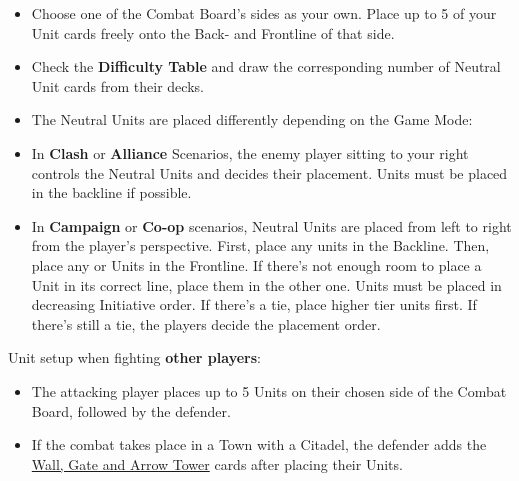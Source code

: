 \begin{itemize}
  \item Choose one of the Combat Board’s sides as your own.
Place up to 5 of your Unit cards freely onto the Back- and Frontline of that side.
  \item Check the \textbf{Difficulty Table} and draw the corresponding number of Neutral Unit cards from their decks.
  \item The Neutral Units are placed differently depending on the Game Mode:
  \item In \textbf{Clash} or \textbf{Alliance} Scenarios, the enemy player sitting to your right controls the Neutral Units and decides their placement.
 Units must be placed in the backline if possible.
  \item In \textbf{Campaign} or \textbf{Co-op} scenarios, Neutral Units are placed from left to right from the player's perspective.
First, place any  units in the Backline.
Then, place any  or  Units in the Frontline.
If there's not enough room to place a Unit in its correct line, place them in the other one.
Units must be placed in decreasing Initiative order.
If there's a tie, place higher tier units first.
If there's still a tie, the players decide the placement order.
\end{itemize}
Unit setup when fighting \textbf{other players}:
\begin{itemize}[wide]
  \item The attacking player places up to 5 Units on their chosen side of the Combat Board, followed by the defender.
  \item If the combat takes place in a Town with a Citadel, the defender adds the \hyperlink{Walls}{Wall, Gate and Arrow Tower} cards after placing their Units.
\end{itemize}

\clearpage
